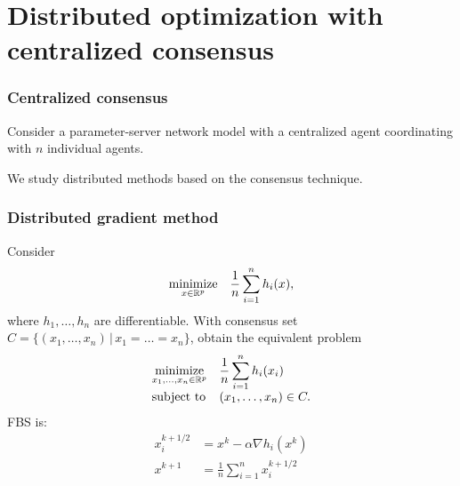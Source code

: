 \documentclass[10pt,mathserif]{beamer}
\begin{document}




\section{Distributed optimization with centralized consensus}
\begin{frame}
\frametitle{Centralized consensus}
Consider a parameter-server network model with a centralized agent coordinating with $n$ individual agents.

\begin{center}
\end{center}

\vspace{0.2in}

We study distributed methods based on the consensus technique.

\end{frame}


\begin{frame}
\frametitle{Distributed gradient method}
Consider 
\[
\begin{array}{ll}
\underset{x\in\mathbb{R}^p}{\mbox{minimize}} &\displaystyle{\frac{1}{n}\sum_{i=1}^n h_i(x)},
\end{array}
\]
where $h_1,\dots,h_n$ are differentiable.
With consensus set $C=\{(x_1,\dots,x_n)\,|\,x_1=\dots=x_n\}$, obtain the equivalent problem
\[
\begin{array}{ll}
\underset{x_1,\dots,x_n \in\mathbb{R}^p}{\mbox{minimize}} &\displaystyle{\frac{1}{n}\sum_{i=1}^n h_i(x_i)}\\
\mbox{subject to}& (x_1,\dots,x_n)\in C.
\end{array}
\]
\pause 
FBS is:
\begin{align*}
x^{k+1/2}_i&=x^k-\alpha\nabla h_i(x^k)\\
x^{k+1}&=\frac{1}{n}\sum^n_{i=1}x_i^{k+1/2}
\end{align*}
\end{frame}
\end{document}
